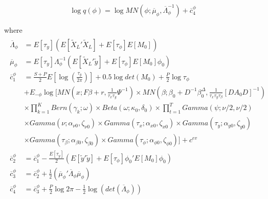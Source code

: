 \documentclass[11pt]{article}
\begin{document}
\begin{equation}
	\log q\left(\phi\right) = \log MN\left(\phi;\overline{\mu}_{\phi},\overline{\Lambda}_{\phi}^{-1}\right)+\overline{c}_{4}^{\phi}
\end{equation}

where
\begin{align*}
\begin{split}
	\overline{\Lambda}_{\phi}	&=	E[\tau_{y}]\left(E\left[\tilde{X}_{L}'\tilde{X}_{L}\right]+E\left[\tau_{\phi}\right]E\left[M_{0}\right]\right)\\
	\overline{\mu}_{\phi}		&=	E[\tau_{y}]\Lambda_{\phi}^{-1}\left(E\left[\tilde{X}_{L}'\tilde{y}\right]+E\left[\tau_{\phi}\right]E\left[M_{0}\right]\phi_{0}\right)\\
	\overline{c}_{1}^{\phi}	&=	\frac{S+P}{2}E\left[\log\left(\frac{\tau_{y}}{2\pi}\right)\right]+0.5\log det\left(M_{0}\right)+\frac{P}{2}\log\tau_{\phi}\\
						&+E_{-\phi}\log\Bigg[MN\left(x;F\beta+r,\frac{1}{\tau_{x}\tau_{y}}\Psi^{-1}\right)\times MN\left(\beta;\beta_{0}+D^{-1}\beta_{0}^{\Delta},\frac{1}{\tau_{x}\tau_{y}\tau_{\beta}}\left[DA_{0}D\right]^{-1}\right)\\
						&\times\prod_{k=1}^{K}Bern\left(\gamma_{k};\omega\right)\times Beta\left(\omega;\kappa_{0},\delta_{0}\right)\times\prod_{t=1}^{T}Gamma\left(\psi;\nu/2,\nu/2\right)\\
						&\times Gamma\left(\nu;\alpha_{\nu0},\zeta_{\nu0}\right)\times Gamma\left(\tau_{x};\alpha_{x0},\zeta_{x0}\right)\times Gamma\left(\tau_{y};\alpha_{y0},\zeta_{y0}\right)\\
						&\times Gamma\left(\tau_{\beta};\alpha_{\beta0},\zeta_{\beta0}\right)\times Gamma\left(\tau_{\phi};\alpha_{\phi0},\zeta_{\phi0}\right)\Bigg]+c^{ev}\\
	\overline{c}_{2}^{\phi}	&= 	\overline{c}_{1}^{\phi}-\frac{E[\tau_{y}]}{2}\left(E\left[\tilde{y}'\tilde{y}\right]+E\left[\tau_{\phi}\right]\phi_{0}'E\left[M_{0}\right]\phi_{0}\right)\\
	\overline{c}_{3}^{\phi}	&=	\overline{c}_{2}^{\phi}+\frac{1}{2}\left(\overline{\mu}_{\phi}'\overline{\Lambda}_{\phi}\overline{\mu}_{\phi}\right)\\
	\overline{c}_{4}^{\phi}	&=	\overline{c}_{3}^{\phi}+\frac{P}{2}\log2\pi-\frac{1}{2}\log\left(det\left(\overline{\Lambda}_{\phi}\right)\right)
\end{split}
\end{align*}
\end{document}
